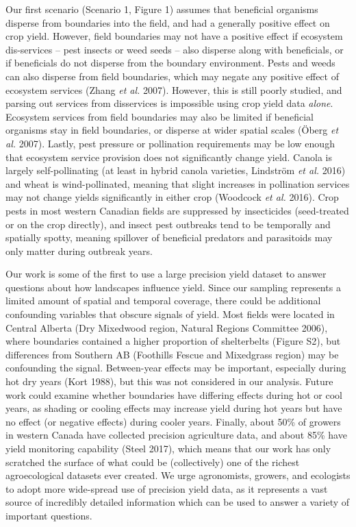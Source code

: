 \documentclass[]{elsarticle} %
\begin{document}
Our first scenario (Scenario 1, Figure 1) assumes that beneficial organisms disperse from boundaries into the field, and had a generally positive effect on crop yield.
However, field boundaries may not have a positive effect if ecosystem dis-services -- pest insects or weed seeds -- also disperse along with beneficials, or if beneficials do not disperse from the boundary environment.
Pests and weeds can also disperse from field boundaries, which may negate any positive effect of ecosystem services (Zhang \emph{et al.} 2007).
However, this is still poorly studied, and parsing out services from disservices is impossible using crop yield data \emph{alone}.
Ecosystem services from field boundaries may also be limited if beneficial organisms stay in field boundaries, or disperse at wider spatial scales (Öberg \emph{et al.} 2007).
Lastly, pest pressure or pollination requirements may be low enough that ecosystem service provision does not significantly change yield.
Canola is largely self-pollinating (at least in hybrid canola varieties, Lindström \emph{et al.} 2016) and wheat is wind-pollinated, meaning that slight increases in pollination services may not change yields significantly in either crop (Woodcock \emph{et al.} 2016).
Crop pests in most western Canadian fields are suppressed by insecticides (seed-treated or on the crop directly), and insect pest outbreaks tend to be temporally and spatially spotty, meaning spillover of beneficial predators and parasitoids may only matter during outbreak years.

Our work is some of the first to use a large precision yield dataset to answer questions about how landscapes influence yield.
Since our sampling represents a limited amount of spatial and temporal coverage, there could be additional confounding variables that obscure signals of yield.
Most fields were located in Central Alberta (Dry Mixedwood region, Natural Regions Committee 2006), where boundaries contained a higher proportion of shelterbelts (Figure S2), but differences from Southern AB (Foothills Fescue and Mixedgrass region) may be confounding the signal.
Between-year effects may be important, especially during hot dry years (Kort 1988), but this was not considered in our analysis.
Future work could examine whether boundaries have differing effects during hot or cool years, as shading or cooling effects may increase yield during hot years but have no effect (or negative effects) during cooler years.
Finally, about 50\% of growers in western Canada have collected precision agriculture data, and about 85\% have yield monitoring capability (Steel 2017), which means that our work has only scratched the surface of what could be (collectively) one of the richest agroecological datasets ever created.
We urge agronomists, growers, and ecologists to adopt more wide-spread use of precision yield data, as it represents a vast source of incredibly detailed information which can be used to answer a variety of important questions.
\end{document}
